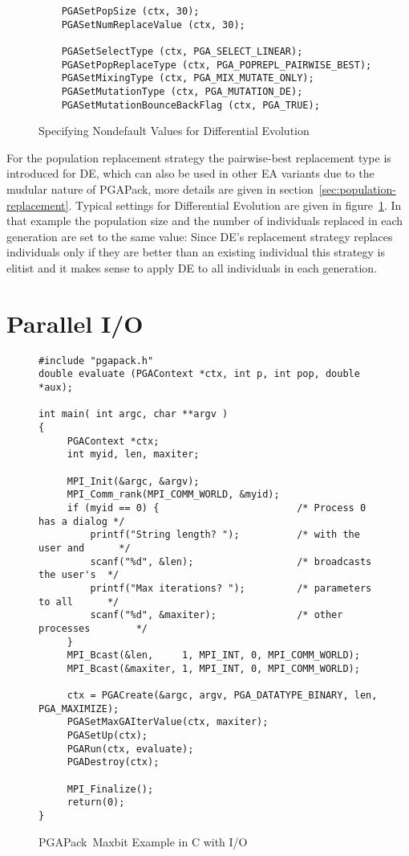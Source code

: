 \documentclass{report}
\newcommand{\pga}{PGAPack}
\begin{document}
\begin{figure}[bt]
\begin{verbatim}
    PGASetPopSize (ctx, 30);
    PGASetNumReplaceValue (ctx, 30);

    PGASetSelectType (ctx, PGA_SELECT_LINEAR);
    PGASetPopReplaceType (ctx, PGA_POPREPL_PAIRWISE_BEST);
    PGASetMixingType (ctx, PGA_MIX_MUTATE_ONLY);
    PGASetMutationType (ctx, PGA_MUTATION_DE);
    PGASetMutationBounceBackFlag (ctx, PGA_TRUE);
\end{verbatim}
\caption{Specifying Nondefault Values for Differential Evolution}
\label{example:de-settings}
\end{figure}


For the population replacement strategy the
pairwise-best replacement type is introduced for DE, which can also be
used in other EA variants due to the mudular nature of \pga, more
details are given in section~\ref{sec:population-replacement}. Typical
settings for Differential Evolution are given in
figure~\ref{example:de-settings}. In that example the population size
and the number of individuals replaced in each generation are set to the
same value: Since DE's replacement strategy replaces individuals only if
they are better than an existing individual this strategy is elitist and
it makes sense to apply DE to all individuals in each generation.


\section{Parallel I/O}\label{sec:parallel-simple-example}

\begin{figure}
\begin{verbatim}
#include "pgapack.h"
double evaluate (PGAContext *ctx, int p, int pop, double *aux);

int main( int argc, char **argv )
{
     PGAContext *ctx;
     int myid, len, maxiter;

     MPI_Init(&argc, &argv);
     MPI_Comm_rank(MPI_COMM_WORLD, &myid);
     if (myid == 0) {                        /* Process 0 has a dialog */
         printf("String length? ");          /* with the user and      */
         scanf("%d", &len);                  /* broadcasts the user's  */
         printf("Max iterations? ");         /* parameters to all      */
         scanf("%d", &maxiter);              /* other processes        */
     }
     MPI_Bcast(&len,     1, MPI_INT, 0, MPI_COMM_WORLD);
     MPI_Bcast(&maxiter, 1, MPI_INT, 0, MPI_COMM_WORLD);

     ctx = PGACreate(&argc, argv, PGA_DATATYPE_BINARY, len, PGA_MAXIMIZE);
     PGASetMaxGAIterValue(ctx, maxiter);
     PGASetUp(ctx);
     PGARun(ctx, evaluate);
     PGADestroy(ctx);

     MPI_Finalize();
     return(0);
}
\end{verbatim}
\caption{\pga\ Maxbit Example in C with I/O}
\label{example:parallel-simple-main}
\end{figure}
\end{document}
